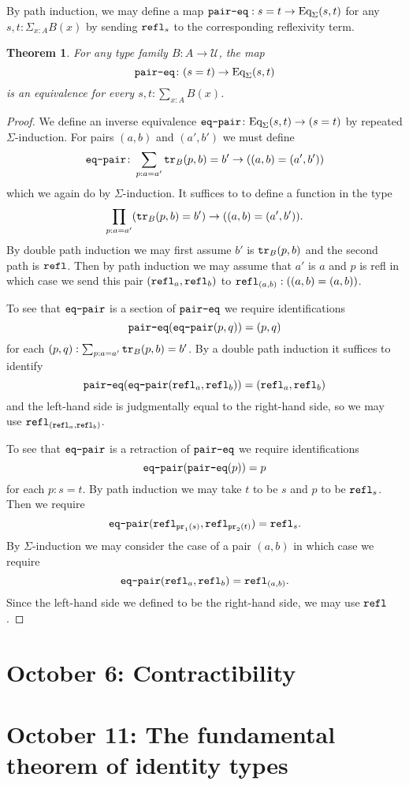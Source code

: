 \documentclass{amsart}
\theoremstyle{theorem}
\newtheorem*{thm}{Theorem}
\theoremstyle{definition}
\theoremstyle{remark}
\newcommand{\0}{\mathbbe{0}}
\newcommand{\1}{\mathbbe{1}}
\newcommand{\2}{\mathbbe{2}}
\newcommand{\3}{\mathbbe{3}}
\newcommand{\4}{\mathbbe{4}}
\newcommand{\term}[1]{{\textup{\texttt{#1}}}}
\newcommand{\pr}{\term{pr}}
\newcommand{\refl}{\term{refl}}
\newcommand{\tr}{\term{tr}}
\newcommand{\UU}{{\mathcal{U}}}
\newcommand{\Eq}{\textup{\text{Eq}}}
\begin{document}
By path induction, we may define a map $\term{pair-eq} : s =t \to \Eq_\Sigma(s,t)$ for any $s,t : \Sigma_{x:A}B(x)$ by sending $\refl_s$ to the corresponding reflexivity term.

\begin{thm} For any type family $B \colon A \to \UU$, the map
\[ \term{pair-eq} \colon (s=t) \to \Eq_\Sigma(s,t)\]
is an equivalence for every $s,t : \sum_{x:A}B(x)$.
\end{thm}
\begin{proof}
We define an inverse equivalence $\term{eq-pair} \colon \Eq_\Sigma(s,t) \to (s=t)$ by repeated $\Sigma$-induction. For pairs $(a,b)$ and $(a',b')$ we must define
\[ \term{eq-pair} \colon \sum_{p : a =a'} \tr_B(p,b)=b' \to ((a,b) = (a',b'))\]
which we again do by $\Sigma$-induction. It suffices to to define a function in the type
\[ \prod_{p: a = a'} (\tr_B(p,b) = b') \to ((a,b)= (a',b')).\]
By double path induction we may first assume $b'$ is $\tr_B(p,b)$ and the second path is $\refl$. Then by path induction we may assume that $a'$ is $a$ and $p$ is refl in which case we send this pair $(\refl_a,\refl_b)$ to $\refl_{(a,b)} : ((a,b) = (a,b))$.

To see that $\term{eq-pair}$ is a section of $\term{pair-eq}$ we require identifications
\[ \term{pair-eq}(\term{eq-pair}(p,q)) = (p,q)\]
for each $(p,q) : \sum_{p : a=a'}\tr_B(p,b)=b'$. By a double path induction it suffices to identify
\[ \term{pair-eq}(\term{eq-pair}(\refl_a,\refl_b)) = (\refl_a,\refl_b)\] and the left-hand side is judgmentally equal to the right-hand side, so we may use $\refl_{(\refl_a,\refl_b)}$.

To see that  $\term{eq-pair}$ is a retraction of $\term{pair-eq}$ we require identifications
\[ \term{eq-pair}(\term{pair-eq} (p)) = p\]
for each $p : s=t$. By path induction we may take $t$ to be $s$ and $p$ to be $\refl_s$. Then we require
\[ \term{eq-pair}(\refl_{\pr_1(s)},\refl_{\pr_2(t)}) = \refl_s.\]
By $\Sigma$-induction we may consider the case of a pair $(a,b)$ in which case we require
\[ \term{eq-pair}(\refl_a,\refl_b) = \refl_{(a,b)}.\]
Since the left-hand side we defined to be the right-hand side, we may use $\refl$.
\end{proof}


\section*{October 6: Contractibility}
\section*{October 11: The fundamental theorem of identity types}
\end{document}
